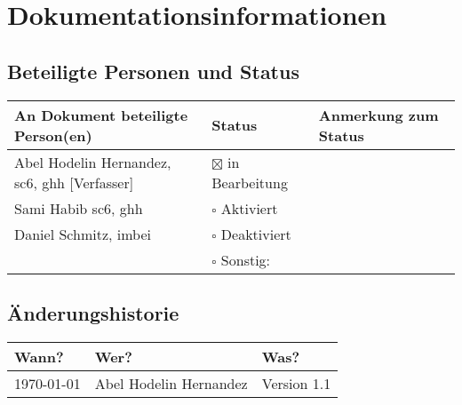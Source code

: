\chapter{Dokumentationsinformationen}

\section{Beteiligte Personen und Status}
\begin{table}[ht]
	\centering  	
	\begin{tabular}{||l|l|l||}   		
		\hline
		An Dokument beteiligte Person(en) & Status & Anmerkung zum Status \\
		\hline\hline
		Abel Hodelin Hernandez, \acs{sc6}, \acs{ghh} [Verfasser] &  $\boxtimes$ in Bearbeitung & \\
		
		Sami Habib \acs{sc6}, \acs{ghh} & $\square$ Aktiviert & \\
		
		Daniel Schmitz, \acs{imbei} & $\square$ Deaktiviert &  \\
		
		& $\square$ Sonstig: &   \\
		\hline
	\end{tabular}
\end{table}

\section{Änderungshistorie}

\begin{table}[ht]
	\centering  	
	\begin{tabular}{||l|l|l||}   		
		\hline
		Wann? & Wer? & Was? \\
		\hline\hline
		\today &  Abel Hodelin Hernandez & Version 1.1 \\
		\hline
	\end{tabular}
\end{table}